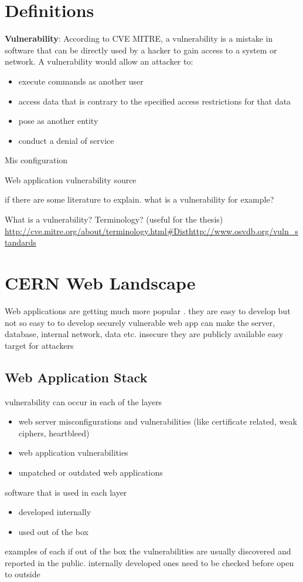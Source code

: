 \section{Definitions}

\textbf{Vulnerability}: According to CVE MITRE, a vulnerability is a mistake in software that can be directly used by a hacker to gain access to a system or network. A vulnerability would allow an attacker to:
\begin{itemize}
\item execute commands as another user
\item access data that is contrary to the specified access restrictions for that data
\item pose as another entity
\item conduct a denial of service
\end{itemize}

Mis configuration

Web application
vulnerability source

if there are some literature to explain. what is a vulnerability for example?

What is a vulnerability? Terminology? (useful for the thesis) 
\url{http://cve.mitre.org/about/terminology.html#Dist}\url{http://www.osvdb.org/vuln_standards}

\section{CERN Web Landscape}
Web applications are getting much more popular . they are easy to develop but not so easy to to develop securely
vulnerable web app can make the server, database, internal network, data etc. insecure
they are publicly available
easy target for attackers

\subsection{Web Application Stack}
vulnerability can occur in each of the layers
\begin{itemize}
\item web server misconfigurations and vulnerabilities (like certificate related, weak ciphers, heartbleed) 
\item web application vulnerabilities
\item unpatched or outdated web applications
\end{itemize}


software that is used in each layer
\begin{itemize}
\item developed internally
\item used out of the box
\end{itemize}
examples of each
if out of the box the vulnerabilities are usually discovered and reported in the public.
internally developed ones need to be checked before open to outside


